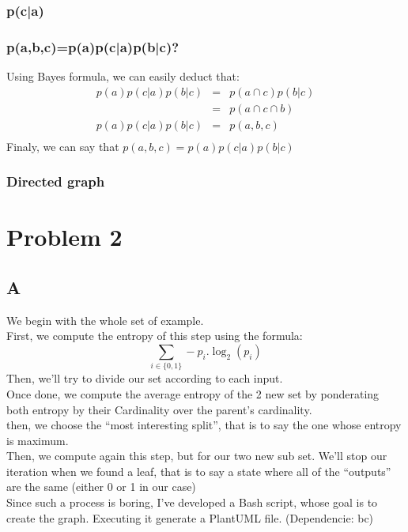 \documentclass{article}
\begin{document}
            \subsubsection{p(c|a)}
            \subsubsection{p(a,b,c)=p(a)p(c|a)p(b|c)?}
                Using Bayes formula, we can easily deduct that:
                \[
                    \begin{array}{rcl}
                        p(a)p(c|a)p(b|c) &=& p(a\cap c)p(b|c)\\
                        &=& p(a\cap c\cap b)\\
                        p(a)p(c|a)p(b|c) &=& p(a, b, c)\\
                    \end{array}
                \]
                Finaly, we can say that $p(a,b,c)=p(a)p(c|a)p(b|c)$
            \subsubsection{Directed graph}
    \section{Problem 2}
        \subsection{A}
            We begin with the whole set of example.\\
            First, we compute the entropy of this step using the formula:
            \[
                \sum_{i\in\{0, 1\}} -p_i.\log_2(p_i)
            \]
            Then, we'll try to divide our set according to each input.\\
            Once done, we compute the average entropy of the 2 new set by ponderating both entropy by their Cardinality over the parent's cardinality.\\
            then, we choose the ``most interesting split'', that is to say the one whose entropy is maximum.\\

            Then, we compute again this step, but for our two new sub set. We'll stop our iteration when we found a leaf, that is to say a state where all of the ``outputs'' are the same (either 0 or 1 in our case)\\
            Since such a process is boring, I've developed a Bash script, whose goal is to create the graph. Executing it generate a PlantUML file. (Dependencie: bc)\\
\end{document}
